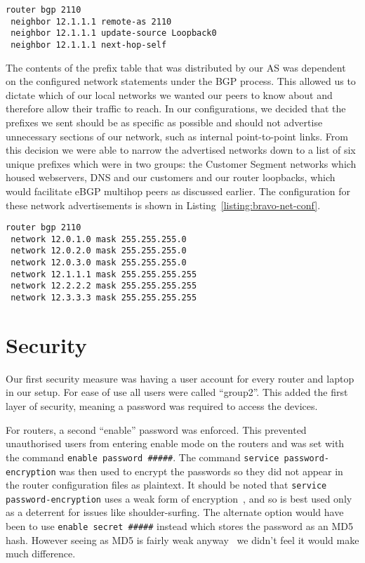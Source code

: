 \begin{lstlisting}[caption={Bravo-Alpha iBGP Configuration}, label={listing:bravo-ibgp-conf}]
router bgp 2110
 neighbor 12.1.1.1 remote-as 2110
 neighbor 12.1.1.1 update-source Loopback0
 neighbor 12.1.1.1 next-hop-self
\end{lstlisting}

The contents of the prefix table that was distributed by our AS was dependent
on the configured network statements under the BGP process. This allowed us to
dictate which of our local networks we wanted our peers to know about and
therefore allow their traffic to reach. In our configurations, we decided that
the prefixes we sent should be as specific as possible and should not advertise
unnecessary sections of our network, such as internal point-to-point links.
From this decision we were able to narrow the advertised networks down to a
list of six unique prefixes which were in two groups: the
Customer Segment networks which housed webservers, DNS and our customers and 
our router loopbacks, which would facilitate eBGP multihop
peers as discussed earlier. The configuration for these network advertisements
is shown in Listing~\ref{listing:bravo-net-conf}.

\begin{lstlisting}[caption={Bravo BGP Network Configuration}, label={listing:bravo-net-conf}]
router bgp 2110
 network 12.0.1.0 mask 255.255.255.0
 network 12.0.2.0 mask 255.255.255.0
 network 12.0.3.0 mask 255.255.255.0
 network 12.1.1.1 mask 255.255.255.255
 network 12.2.2.2 mask 255.255.255.255
 network 12.3.3.3 mask 255.255.255.255
\end{lstlisting}

\section{Security}
Our first security measure was having a user account for every router
and laptop in our setup. For ease of use all users were called ``group2''. This
added the first layer of security, meaning a password was required to access
the devices.

For routers, a second ``enable'' password was enforced. This prevented unauthorised users
from entering enable mode on the routers and was set with the command
\texttt{enable password \#\#\#\#\#}. The command
\texttt{service~password-encryption} was then used to encrypt the passwords so
they did not appear in the router configuration files as plaintext. It should
be noted that
\texttt{service password-encryption} uses a weak form of
encryption~\cite{ciscocracker}, and so is best used only as a deterrent for
issues like shoulder-surfing. The alternate option would have been to use
\texttt{enable secret \#\#\#\#\#} instead which stores the password as an MD5
hash. However seeing as MD5 is fairly weak anyway~\cite{md5} we didn't feel it
would make much difference.

